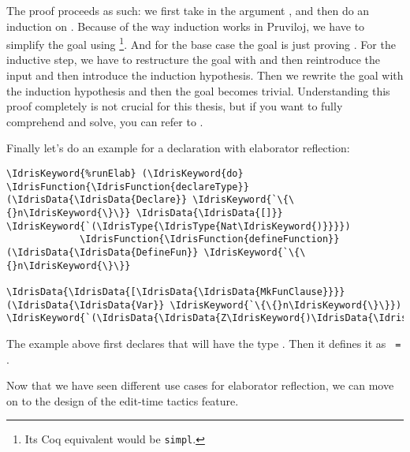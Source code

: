 The proof proceeds as such: we first take in the argument , and then do
an induction on . Because of the way induction works in Pruviloj, we have
to simplify the goal using \footnote{Its Coq equivalent would be
\texttt{simpl}.}.
And for the base case the goal is just proving  \dt{=} .
For the inductive step, we have to restructure the goal with  and
then reintroduce the input and then introduce the induction hypothesis. Then we
rewrite the goal with the induction hypothesis and then the goal becomes
trivial. Understanding this proof completely is not crucial for this thesis,
but if you want to fully comprehend  and {solve}, you can refer to
\cite{elabref}.

Finally let's do an example for a declaration with elaborator reflection:

\begin{Verbatim}[framesep=2mm, label=\footnotesize{\normalfont{Idris}}, labelposition=topline]
\IdrisKeyword{%runElab} (\IdrisKeyword{do} \IdrisFunction{\IdrisFunction{declareType}} (\IdrisData{\IdrisData{Declare}} \IdrisKeyword{`\{\{}n\IdrisKeyword{\}\}} \IdrisData{\IdrisData{[]}} \IdrisKeyword{`(\IdrisType{\IdrisType{Nat\IdrisKeyword{)}}}})
             \IdrisFunction{\IdrisFunction{defineFunction}} (\IdrisData{\IdrisData{DefineFun}} \IdrisKeyword{`\{\{}n\IdrisKeyword{\}\}}
                               \IdrisData{\IdrisData{[\IdrisData{\IdrisData{MkFunClause}}}} (\IdrisData{\IdrisData{Var}} \IdrisKeyword{`\{\{}n\IdrisKeyword{\}\}}) \IdrisKeyword{`(\IdrisData{\IdrisData{Z\IdrisKeyword{)\IdrisData{\IdrisData{]}}}}}}))
\end{Verbatim}

The example above first declares that  will have the type .
Then it defines it as \texttt{ = }.

Now that we have seen different use cases for elaborator reflection, we can move on to the
design of the edit-time tactics feature.



